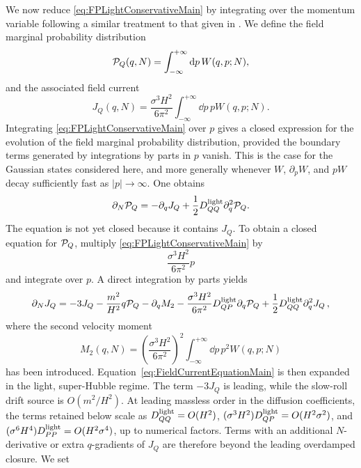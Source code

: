 \documentclass{article}
\numberwithin{equation}{section}
\begin{document}
	We now reduce \cref{eq:FPLightConservativeMain} by integrating over the momentum variable following a similar treatment to that given in \cite{pavliotis2014stochastic}. We define the field marginal probability distribution
	\begin{equation}
		{\cal P}_Q(q,N)
		=
		\int_{-\infty}^{+\infty}\dd p\,W(q,p;N),
		\label{eq:FieldMarginalWignerMain}
	\end{equation}
	and the associated field current
	\begin{equation}
		J_Q(q,N)
		=
		\frac{\sigma^3H^2}{6\pi^2}
		\int_{-\infty}^{+\infty}\dd p\,pW(q,p;N).
		\label{eq:FieldCurrentMain}
	\end{equation}
	Integrating \cref{eq:FPLightConservativeMain} over \(p\) gives a closed expression for the evolution of the field marginal probability distribution, provided the boundary terms generated by integrations by parts in \(p\) vanish. This is the case for the Gaussian states considered here, and more generally whenever \(W\), \(\partial_p W\), and \(pW\) decay sufficiently fast as \(|p|\to\infty\). One obtains
	\begin{equation}
		\partial_N{\cal P}_Q
		=
		-\partial_qJ_Q
		+
		\frac12D_{QQ}^{\rm light}\partial_q^2{\cal P}_Q .
		\label{eq:FieldMarginalMain}
	\end{equation}
	The equation is not yet closed because it contains \(J_Q\). To obtain a closed equation for \({\cal P}_Q\), multiply \cref{eq:FPLightConservativeMain} by
	\[
	\frac{\sigma^3H^2}{6\pi^2}p
	\]
	and integrate over \(p\). A direct integration by parts yields
	\begin{align}
		\partial_NJ_Q
		=
		-3J_Q
		-
		\frac{m^2}{H^2}q{\cal P}_Q
		-
		\partial_qM_2
		-
		\frac{\sigma^3H^2}{6\pi^2}
		D_{QP}^{\rm light}\partial_q{\cal P}_Q
		+
		\frac12D_{QQ}^{\rm light}\partial_q^2J_Q \, ,
		\label{eq:FieldCurrentEquationMain}
	\end{align}
    where the second velocity moment
	\begin{equation}
		M_2(q,N)
		=
		\left(\frac{\sigma^3H^2}{6\pi^2}\right)^2
		\int_{-\infty}^{+\infty}\dd p\,p^2W(q,p;N)
		\label{eq:SecondVelocityMomentMain}
	\end{equation}
    has been introduced.
	Equation~\eqref{eq:FieldCurrentEquationMain} is then expanded in the light, super-Hubble regime. The term \(-3J_Q\) is leading, while the slow-roll drift source is \(O(m^2/H^2)\). At leading massless order in the diffusion coefficients, the terms retained below scale as \(D_{QQ}^{\rm light}=O(H^2)\), \((\sigma^3H^2)D_{QP}^{\rm light}=O(H^2\sigma^2)\), and \((\sigma^6H^4)D_{PP}^{\rm light}=O(H^2\sigma^4)\), up to numerical factors. Terms with an additional \(N\)-derivative or extra \(q\)-gradients of \(J_Q\) are therefore beyond the leading overdamped closure. We set
\end{document}
